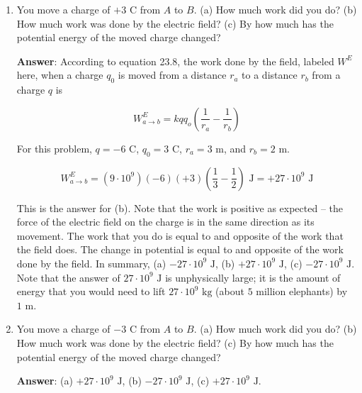 \documentclass{article}
\begin{document}
\begin{enumerate}

  \item You move a charge of $+3\text{ C}$ from $A$ to $B$. (a) How much work did you do? (b) How much work was done by the electric field? (c) By how much has the potential energy of the moved charge changed?

        \ifsolutions
          \textbf{Answer}: According to equation 23.8, the work done by the field, labeled $W^E$ here, when a charge $q_0$ is moved from a distance $r_a$ to a distance $r_b$ from a charge $q$ is
        
          \begin{equation}
        W^E_{a\rightarrow b} = kqq_o\left(\frac{1}{r_a}-\frac{1}{r_b}\right)
        \end{equation}
        
          For this problem, $q=-6\text{ C}$, $q_0=3\text{ C}$, $r_a=3\text{ m}$, and $r_b=2\text{ m}$.
        
          \begin{equation}
        W^E_{a\rightarrow b} = (9\cdot 10^9)(-6)(+3)\left(\frac{1}{3}-\frac{1}{2}\right)\text{ J} = +27\cdot 10^9\text{ J}
        \end{equation}
        
          This is the answer for (b). Note that the work is positive as expected -- the force of the electric field on the charge is in the same direction as its movement. The work that you do is equal to and opposite of the work that the field does. The change in potential is equal to and opposite of the work done by the field. In summary, (a) $-27\cdot 10^9\text{ J}$, (b) $+27\cdot 10^9\text{ J}$, (c) $-27\cdot 10^9\text{ J}$. Note that the answer of $27\cdot 10^9\text{ J}$ is unphysically large; it is the amount of energy that you would need to lift $27\cdot 10^9\text{ kg}$ (about $5$ million elephants) by $1\text{ m}$. 
        \else
          \vskip 48pt
        \fi

  \item You move a charge of $-3\text{ C}$ from $A$ to $B$. (a) How much work did you do? (b) How much work was done by the electric field? (c) By how much has the potential energy of the moved charge changed?

        \ifsolutions
          \textbf{Answer}: (a) $+27\cdot 10^9\text{ J}$, (b) $-27\cdot 10^9\text{ J}$, (c) $+27\cdot 10^9\text{ J}$. 
        \else
          \vskip 48pt
        \fi


\end{enumerate}
\end{document}
